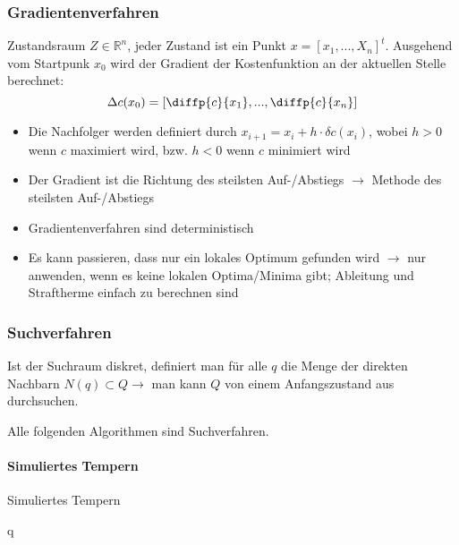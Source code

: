 \subsubsection{Gradientenverfahren}
Zustandsraum \(Z \in \mathbb{R}^n\), jeder Zustand ist ein Punkt \(x = [x_1, ... , X_n]^t\).
Ausgehend vom Startpunk $x_0$ wird der Gradient der Kostenfunktion an der aktuellen Stelle berechnet:
\[\Delta c(x_0) = \left[ \diffp{c}{{x_{1}}}, ... , \diffp{c}{{x_{n}}} \right]\]

\begin{itemize}
	\item Die Nachfolger werden definiert durch \(x_{i+1} = x_i + h \cdot \delta c(x_i)\), wobei \(h > 0\) wenn \(c\) maximiert wird, bzw. \(h < 0\) wenn \(c\) minimiert wird
	\item Der Gradient ist die Richtung des steilsten Auf-/Abstiegs $\rightarrow$ Methode des steilsten Auf-/Abstiegs
	\item Gradientenverfahren sind deterministisch
	\item Es kann passieren, dass nur ein lokales Optimum gefunden wird \(\rightarrow\) nur anwenden, wenn es keine lokalen Optima/Minima gibt; Ableitung und Straftherme einfach zu berechnen sind
\end{itemize}

\subsubsection{Suchverfahren}
Ist der Suchraum diskret, definiert man für alle \(q\) die Menge der direkten Nachbarn \(N(q) \subset Q \rightarrow\) man kann \(Q\) von einem Anfangszustand aus durchsuchen.

Alle folgenden Algorithmen sind Suchverfahren.

\paragraph{Simuliertes Tempern}
\text{} %

\begin{algorithm}[H]
	\caption{Simuliertes Tempern}
        
    \BlankLine

    \Return q
\end{algorithm}


